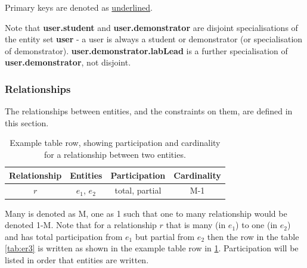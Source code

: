 Primary keys are denoted as \underline{underlined}. %

Note that \textbf{user.student} and \textbf{user.demonstrator} are disjoint specialisations of the entity set \textbf{user} - a user is always a student or demonstrator (or specialisation of demonstrator). \textbf{user.demonstrator.labLead} is a further specialisation of \textbf{user.demonstrator}, not disjoint. 

\subsubsection{Relationships}\label{sec:relationship}
The relationships between entities, and the constraints on them, are defined in this section. 

\FloatBarrier
\begin{table}[H]
\centering
\begin{tabular}{ |c|c|c|c| } 
 \hline
 \textbf{Relationship} & \textbf{Entities} & \textbf{Participation} & \textbf{Cardinality}\\ 
 \hline
 $r$ & $e_1$, $e_2$ & total, partial & M-1 \\
 \hline
\end{tabular}
\caption{Example table row, showing participation and cardinality for a relationship between two entities.}
\label{tab:er2}
\end{table}
\FloatBarrier 

Many is denoted as M, one as 1 such that one to many relationship would be denoted 1-M. Note that for a relationship $r$ that is many (in $e_1$) to one (in $e_2$) and has total participation from $e_1$ but partial from $e_2$ then the row in the table \ref{tab:er3} is written as shown in the example table row in \ref{tab:er2}. Participation will be listed in order that entities are written.


